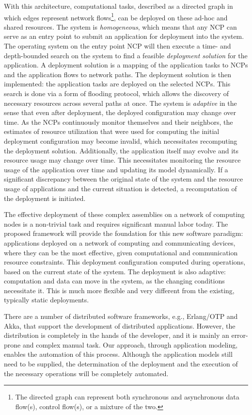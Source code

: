 \documentclass[12pt,letterpaper]{article}
\begin{document}
With this architecture, computational tasks, described as  a directed graph in which edges represent network flows\footnote{The directed graph can represent both synchronous and asynchronous data flow(s), control flow(s), or a mixture of the two.}, can be deployed on these ad-hoc and shared resources. The system is \textit{homogeneous}, which means that any NCP can serve as an entry point to submit an application for deployment into the system. The operating system on the entry point NCP will then execute a time- and depth-bounded search on the system to find a feasible \textit{deployment solution} for the application. A deployment solution is a mapping of the application tasks to NCPs and the application flows to network paths. The deployment solution is then implemented: the application tasks are deployed on the selected NCPs. This search is done via a form of flooding protocol, which allows the discovery of necessary resources across several paths at once.  The system is \textit{adaptive} in the sense that even after deployment, the deployed configuration may change over time. As the NCPs continuously monitor themselves and their neighbors, the estimates of resource utilization that were used for computing the initial deployment configuration may become invalid, which necessitates recomputing the deployment solution. Additionally, the application itself may evolve and its resource usage may change over time. This necessitates monitoring the resource usage of the application over time and updating its model dynamically. If a significant discrepancy between the original state of the system and the resource usage of applications and the current situation is detected, a recomputation of the deployment is initiated.  

The effective deployment of these complex assemblies on a network of computing nodes is a non-trivial task and requires significant manual labor today. The proposed framework will provide the foundation for this new software paradigm: applications deployed on a network of computing and communicating devices, where they can be the most effective, given computational and communication resource constraints. This deployment configuration computed during operations, based on the current state of the system. The deployment is also adaptive: computation and data can move in the system, as the changing conditions necessitate it. This is much more flexible and very different from the existing, typically static deployments. 

There are a number of distributed software frameworks, e.g., Erlang/OTP and Akka, that support the development of distributed applications. However, the distribution is completely in the hands of the developer, and it is mainly an error-prone and complex manual task. Our approach, through application modeling, enables the automation of this process. Although the application models still need to be supplied, the determination of the deployment and the execution of the necessary operations will be completely automated. 
\end{document}
